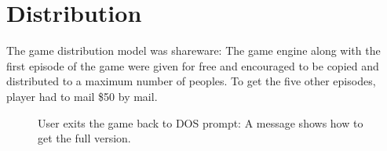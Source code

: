 \documentclass[book.tex]{subfiles}
\begin{document}
\section{Distribution}
The game distribution model was shareware: The game engine along with the first episode of the game were given for free and encouraged to be copied and distributed to a maximum number of peoples. To get the five other episodes, player had to mail \$50 by mail.\\
\par
\begin{figure}[H]
\centering
 \caption{User exits the game back to DOS prompt: A message shows how to get the full version.}
 \end{figure}
\end{document}
